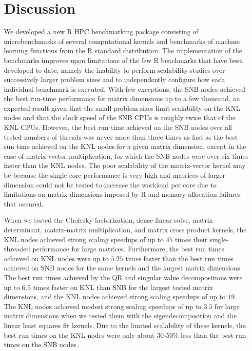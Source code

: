 \section{Discussion} \label{sec:discuss}
We developed a new R HPC benchmarking package consisting of microbenchmarks of
  several computational kernels and benchmarks of machine learning functions
  from the R standard distribution.
The implementation of the benchmarks improves upon limitations of the few R
  benchmarks that have been developed to date, namely the inability to perform
  scalability studies over successively larger problem sizes and to
  independently configure how each individual benchmark is executed.
With few exceptions, the SNB nodes achieved the best run-time
  performance for matrix dimensions up to a few thousand, an expected result
  given that the small problem sizes limit scalability on the KNL nodes
  and that the clock speed of the SNB CPUs is roughly twice that of
  the KNL CPUs.
However, the best run time achieved on the SNB nodes over all tested numbers
  of threads was never more
  than three times as fast as the best run time achieved on the KNL
  nodes for a given matrix dimension, except in the case of matrix-vector
  multiplication, for which the SNB nodes were over six times faster
  than the KNL nodes.
The poor scalability of the matrix-vector kernel may be because the single-core
  performance is very high and matrices of larger dimension could not be
  tested to increase the workload per core due to limitations on matrix dimensions
  imposed by R and memory allocation failures that occured.

When we tested the Cholesky factorization, dense linear solve, matrix
  determinant, matrix-matrix multiplication, and matrix cross product kernels,
  the KNL nodes achieved strong scaling speedups of up to $45$ times
  their single-threaded performance for large matrices.
Furthermore, the best run times achieved on KNL nodes were up to
  $5.25$ times faster than the best run times achieved on SNB nodes for
  the same kernels and the largest matrix dimensions.
The best run times achieved by the QR and singular value decompositions were up
  to $6.5$ times faster on KNL than SNB for the largest
  tested matrix dimensions, and the KNL nodes achieved strong
  scaling speedups of up to $19$.
The KNL nodes achieved modest strong scaling speedups of up to $3.5$
  for large matrix dimensions when we tested them with the eigendecomposition
  and the linear least squares fit kernels.
Due to the limited scalability of these kernels, the best run times on the
  KNL nodes were only about $30$-$50\%$ less than the best run
  times on the SNB nodes.

